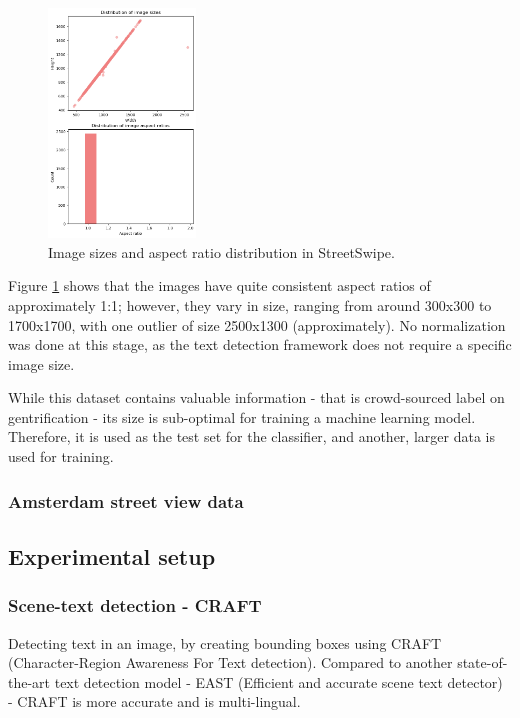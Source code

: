 \begin{figure}[H]
    \centering
    \includegraphics[width=0.35\textwidth]{media/methodology/SS_size_ar.png}
    \caption{Image sizes and aspect ratio distribution in StreetSwipe.}
    \label{fig:SS_size_ar}
\end{figure}

Figure \ref{fig:SS_size_ar} shows that the images have quite consistent aspect ratios of approximately 1:1; however, they vary in size, ranging from around 300x300 to 1700x1700, with one outlier of size 2500x1300 (approximately). No normalization was done at this stage, as the text detection framework does not require a specific image size.

While this dataset contains valuable information - that is crowd-sourced label on gentrification - its size is sub-optimal for training a machine learning model. Therefore, it is used as the test set for the classifier, and another, larger data is used for training.

\subsubsection{Amsterdam street view data}


\subsection{Experimental setup}
\subsubsection{Scene-text detection - CRAFT}
Detecting text in an image, by creating bounding boxes using CRAFT (Character-Region Awareness For Text detection). Compared to another state-of-the-art text detection model - EAST (Efficient and accurate scene text detector) - CRAFT is more accurate and is multi-lingual.

